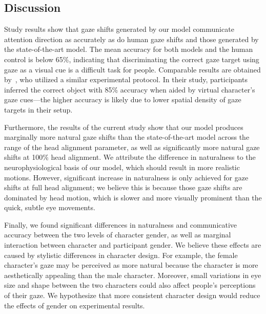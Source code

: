 \subsection{Discussion}

Study results show that gaze shifts generated by our model communicate attention direction as accurately as do human gaze shifts and those generated by the state-of-the-art model. The mean accuracy for both models and the human control is below 65\%, indicating that discriminating the correct gaze target using gaze as a visual cue is a difficult task for people. Comparable results are obtained by~\citet{bailly2010gaze}, who utilized a similar experimental protocol. In their study, participants inferred the correct object with 85\% accuracy when aided by virtual character's gaze cues---the higher accuracy is likely due to lower spatial density of gaze targets in their setup.

Furthermore, the results of the current study show that our model produces marginally more natural gaze shifts than the state-of-the-art model across the range of the head alignment parameter, as well as significantly more natural gaze shifts at 100\% head alignment. We attribute the difference in naturalness to the neurophysiological basis of our model, which should result in more realistic motions. However, significant increase in naturalness is only achieved for gaze shifts at full head alignment; we believe this is because those gaze shifts are dominated by head motion, which is slower and more visually prominent than the quick, subtle eye movements.

Finally, we found significant differences in naturalness and communicative accuracy between the two levels of character gender, as well as marginal interaction between character and participant gender. We believe these effects are caused by stylistic differences in character design. For example, the female character's gaze may be perceived as more natural because the character is more aesthetically appealing than the male character. Moreover, small variations in eye size and shape between the two characters could also affect people's perceptions of their gaze. We hypothesize that more consistent character design would reduce the effects of gender on experimental results. 
